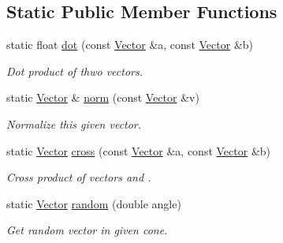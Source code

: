 \subsection*{Static Public Member Functions}
\begin{DoxyCompactItemize}
\item 
\mbox{\label{struct_vector_ab877406424d9ff3f74026220ea0c63e7}} 
static float \mbox{\hyperlink{struct_vector_ab877406424d9ff3f74026220ea0c63e7}{dot}} (const \mbox{\hyperlink{struct_vector}{Vector}} \&a, const \mbox{\hyperlink{struct_vector}{Vector}} \&b)
\begin{DoxyCompactList}\small\item\em Dot product of thwo vectors. \end{DoxyCompactList}\item 
\mbox{\label{struct_vector_a05c8f58e59d12e3b2fa710b54f533eff}} 
static \mbox{\hyperlink{struct_vector}{Vector}} \& \mbox{\hyperlink{struct_vector_a05c8f58e59d12e3b2fa710b54f533eff}{norm}} (const \mbox{\hyperlink{struct_vector}{Vector}} \&v)
\begin{DoxyCompactList}\small\item\em Normalize this given vector. \end{DoxyCompactList}\item 
\mbox{\label{struct_vector_ac7b23dd7069156a30abaa0f6bea7132f}} 
static \mbox{\hyperlink{struct_vector}{Vector}} \mbox{\hyperlink{struct_vector_ac7b23dd7069156a30abaa0f6bea7132f}{cross}} (const \mbox{\hyperlink{struct_vector}{Vector}} \&a, const \mbox{\hyperlink{struct_vector}{Vector}} \&b)
\begin{DoxyCompactList}\small\item\em Cross product of vectors {\itshape and} {\bfseries }. \end{DoxyCompactList}\item 
\mbox{\label{struct_vector_a7b25f40c0b16dc471ed2be59ede05225}} 
static \mbox{\hyperlink{struct_vector}{Vector}} \mbox{\hyperlink{struct_vector_a7b25f40c0b16dc471ed2be59ede05225}{random}} (double angle)
\begin{DoxyCompactList}\small\item\em Get random vector in given  cone. \end{DoxyCompactList}\end{DoxyCompactItemize}
